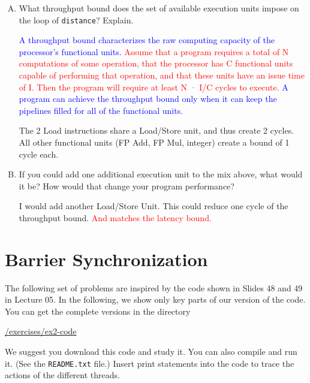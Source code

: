 \documentclass[11pt]{article}
\newcommand{\cref}[2]{\href{#1}{\color{blue}#2}}
\newenvironment{choice}{\begin{enumerate}[A.]}{\end{enumerate}}
\newenvironment{answer}{\begin{minipage}[c][1.5in]{\textwidth}}{\end{minipage}}
\begin{document}
\begin{choice}
\begin{answer}
\end{answer}

\item
What throughput bound does the set of available execution units impose on the loop of \lstinline{distance}?  Explain.

\begin{answer}
\textcolor{blue}{A throughput bound characterizes the raw computing capacity of the processor's functional units.}
\textcolor{red}{Assume that a program requires a total of N computations of some operation, that the processor has C functional units capable of performing that operation, and that these units have an issue time of I. Then the program will require at least N · I/C cycles to execute.}
\textcolor{blue}{A program can achieve the throughput bound only when it can keep the pipelines filled for all of the functional units. 
}

The 2 Load instructions share a Load/Store unit, and thus create 2 cycles. All other functional units (FP Add, FP Mul, integer) create a bound of 1 cycle each. 

\end{answer}

\item
If you could add one additional execution unit to the mix above, what
would it be?  How would that change your program performance?

\begin{answer}
I would add another Load/Store Unit. This could reduce one cycle of the throughput bound. 
\textcolor{red}{And matches the latency bound. }

\end{answer}
\end{choice}


\section*{Barrier Synchronization}

The following set of problems are inspired by the code shown in Slides 48 and 49 in Lecture 05. 
In the following, we show only key parts of our version of the code. 
You can get the complete versions in the directory 
\begin{center} 
  \cref{\actualcoursehome/exercises/ex2-code}{\visiblecoursehome/exercises/ex2-code} 
\end{center} 
We suggest you download this code and study it.  You can also compile 
and run it.  (See the \texttt{README.txt} file.)  Insert print statements into the code to trace the 
actions of the different threads. 
\end{document}

